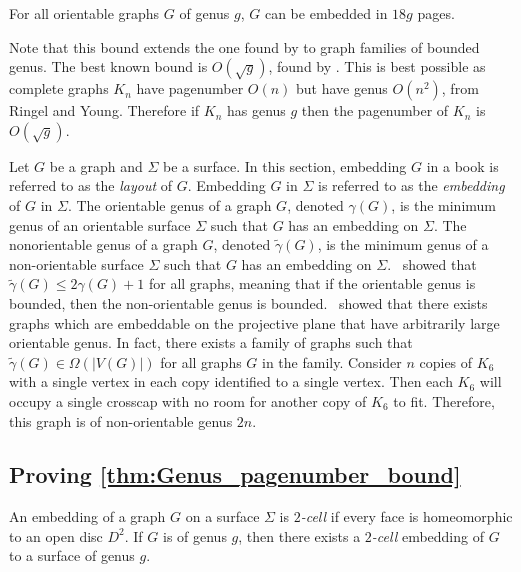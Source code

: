 \begin{theorem}\label{thm:Genus_pagenumber_bound}
	For all orientable graphs \(G\) of genus $g$, $G$ can be embedded in $18g$ pages.
\end{theorem}
Note that this bound extends the one found by \textcite{yannakakisEmbeddingPlanarGraphs1989} to graph families of bounded genus.
The best known bound is \(O(\sqrt{g})\), found by \textcite{malitzGenusGraphsHave1994}. This is best possible as complete graphs $K_n$ have pagenumber $O(n)$ but have genus $O(n^2)$, from Ringel and Young\cite{ringelMapColorTheorem1974}. Therefore if $K_n$ has genus $g$ then the pagenumber of $K_n$ is $O(\sqrt{g})$.

Let $G$ be a graph and $\Sigma$ be a surface. In this section, embedding $G$ in a book is referred to as the \textit{layout} of $G$. Embedding $G$ in $\Sigma$ is referred to as the \textit{embedding} of $G$ in $\Sigma$. The orientable genus of a graph \(G\), denoted \(\gamma(G)\), is the minimum genus of an orientable surface $\Sigma$ such that $G$ has an embedding on $\Sigma$. The nonorientable genus of a graph \(G\), denoted \(\tilde{\gamma}(G)\), is the minimum genus of a non-orientable surface $\Sigma$ such that $G$ has an embedding on $\Sigma$.\ \textcite{moharOrientableGenusGraphs1998} showed that \(\tilde{\gamma}(G) \leq 2 \gamma(G) + 1\) for all graphs, meaning that if the orientable genus is bounded, then the non-orientable genus is bounded.\ \textcite{auslanderImbeddingGraphsManifolds1963} showed that there exists graphs which are embeddable on the projective plane that have arbitrarily large orientable genus. In fact, there exists a family of graphs such that $\tilde{\gamma}(G) \in \Omega(|V(G)|)$ for all graphs $G$ in the family. Consider $n$ copies of $K_6$ with a single vertex in each copy identified to a single vertex. Then each $K_6$ will occupy a single crosscap with no room for another copy of $K_6$ to fit. Therefore, this graph is of non-orientable genus $2n$. 

\subsection{Proving \cref{thm:Genus_pagenumber_bound}}
An embedding of a graph $G$ on a surface $\Sigma$ is \textit{$2$-cell} if every face is homeomorphic to an open disc $D^2$. If $G$ is of genus $g$, then there exists a \textit{$2$-cell} embedding of $G$ to a surface of genus $g$. 

